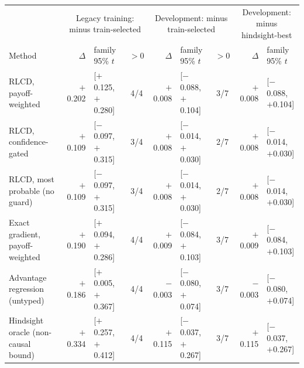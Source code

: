 \begin{tabular}{lrlcrlcrl}
\toprule
 & \multicolumn{3}{c}{Legacy training: minus train-selected} & \multicolumn{3}{c}{Development: minus train-selected} & \multicolumn{2}{c}{Development: minus hindsight-best} \\
Method & $\Delta$ & family 95\% $t$ & $>0$ & $\Delta$ & family 95\% $t$ & $>0$ & $\Delta$ & family 95\% $t$ \\
\midrule
RLCD, payoff-weighted & $+$0.202 & [$+$0.125, $+$0.280] & 4/4 & $+$0.008 & [$-$0.088, $+$0.104] & 3/7 & $+$0.008 & [$-$0.088, $+$0.104] \\
RLCD, confidence-gated & $+$0.109 & [$-$0.097, $+$0.315] & 3/4 & $+$0.008 & [$-$0.014, $+$0.030] & 2/7 & $+$0.008 & [$-$0.014, $+$0.030] \\
RLCD, most probable (no guard) & $+$0.109 & [$-$0.097, $+$0.315] & 3/4 & $+$0.008 & [$-$0.014, $+$0.030] & 2/7 & $+$0.008 & [$-$0.014, $+$0.030] \\
Exact gradient, payoff-weighted & $+$0.190 & [$+$0.094, $+$0.286] & 4/4 & $+$0.009 & [$-$0.084, $+$0.103] & 3/7 & $+$0.009 & [$-$0.084, $+$0.103] \\
Advantage regression (untyped) & $+$0.186 & [$+$0.005, $+$0.367] & 4/4 & $-$0.003 & [$-$0.080, $+$0.074] & 3/7 & $-$0.003 & [$-$0.080, $+$0.074] \\
Hindsight oracle (non-causal bound) & $+$0.334 & [$+$0.257, $+$0.412] & 4/4 & $+$0.115 & [$-$0.037, $+$0.267] & 3/7 & $+$0.115 & [$-$0.037, $+$0.267] \\
\bottomrule
\end{tabular}
